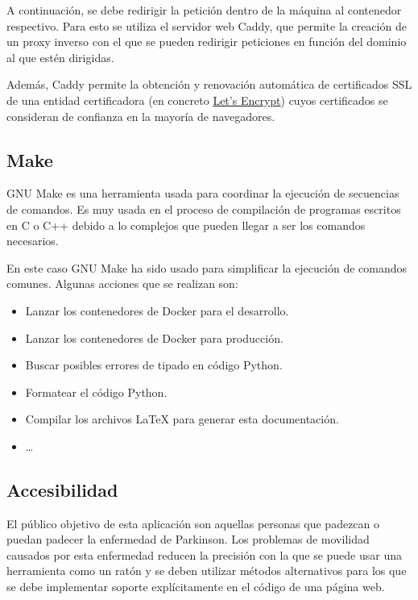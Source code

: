 A continuación, se debe redirigir la petición dentro de la máquina al contenedor
respectivo. Para esto se utiliza el servidor web Caddy, que permite la creación
de un proxy inverso con el que se pueden redirigir peticiones en función del
dominio al que estén dirigidas.

Además, Caddy permite la obtención y renovación automática de certificados SSL
de una entidad certificadora (en concreto \href{https://letsencrypt.org/}{Let's
Encrypt}) cuyos certificados se consideran de confianza en la mayoría de
navegadores.

\subsection{Make}

GNU Make es una herramienta usada para coordinar la ejecución de secuencias de
comandos. Es muy usada en el proceso de compilación de programas escritos en C o
C++ debido a lo complejos que pueden llegar a ser los comandos necesarios.

En este caso GNU Make ha sido usado para simplificar la ejecución de comandos
comunes. Algunas acciones que se realizan son:

\begin{itemize}
    \item Lanzar los contenedores de Docker para el desarrollo.
    \item Lanzar los contenedores de Docker para producción.
    \item Buscar posibles errores de tipado en código Python.
    \item Formatear el código Python.
    \item Compilar los archivos \LaTeX{} para generar esta documentación.
    \item \dots
\end{itemize}

\subsection{Accesibilidad}

El público objetivo de esta aplicación son aquellas personas que padezcan o
puedan padecer la enfermedad de Parkinson. Los problemas de movilidad causados
por esta enfermedad reducen la precisión con la que se puede usar una
herramienta como un ratón y se deben utilizar métodos alternativos para los que
se debe implementar soporte explícitamente en el código de una página web.

